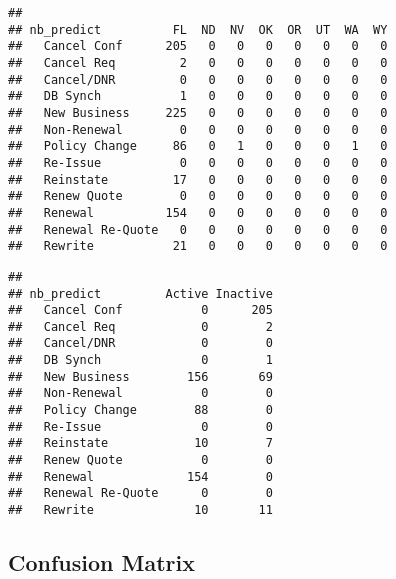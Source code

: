 \documentclass[]{article}
\newenvironment{Shaded}{\begin{snugshade}}{\end{snugshade}}
\newcommand{\KeywordTok}[1]{\textcolor[rgb]{0.13,0.29,0.53}{\textbf{#1}}}
\newcommand{\NormalTok}[1]{#1}
\newcommand{\OperatorTok}[1]{\textcolor[rgb]{0.81,0.36,0.00}{\textbf{#1}}}
\begin{document}
\begin{Shaded}
\end{Shaded}

\begin{verbatim}
##                   
## nb_predict          FL  ND  NV  OK  OR  UT  WA  WY
##   Cancel Conf      205   0   0   0   0   0   0   0
##   Cancel Req         2   0   0   0   0   0   0   0
##   Cancel/DNR         0   0   0   0   0   0   0   0
##   DB Synch           1   0   0   0   0   0   0   0
##   New Business     225   0   0   0   0   0   0   0
##   Non-Renewal        0   0   0   0   0   0   0   0
##   Policy Change     86   0   1   0   0   0   1   0
##   Re-Issue           0   0   0   0   0   0   0   0
##   Reinstate         17   0   0   0   0   0   0   0
##   Renew Quote        0   0   0   0   0   0   0   0
##   Renewal          154   0   0   0   0   0   0   0
##   Renewal Re-Quote   0   0   0   0   0   0   0   0
##   Rewrite           21   0   0   0   0   0   0   0
\end{verbatim}

\begin{Shaded}
\end{Shaded}

\begin{verbatim}
##                   
## nb_predict         Active Inactive
##   Cancel Conf           0      205
##   Cancel Req            0        2
##   Cancel/DNR            0        0
##   DB Synch              0        1
##   New Business        156       69
##   Non-Renewal           0        0
##   Policy Change        88        0
##   Re-Issue              0        0
##   Reinstate            10        7
##   Renew Quote           0        0
##   Renewal             154        0
##   Renewal Re-Quote      0        0
##   Rewrite              10       11
\end{verbatim}

\hypertarget{confusion-matrix}{%
\subsection{Confusion Matrix}\label{confusion-matrix}}
\end{document}
